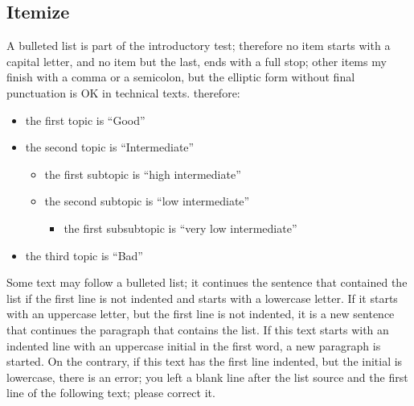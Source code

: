 \subsection{Itemize}
A bulleted list is part of the introductory test; therefore no item starts with a capital letter, and no item but the last, ends with a full stop; other items my finish with a comma or a semicolon, but the elliptic form without final punctuation is OK in technical texts. therefore:
\begin{itemize}
	\item the first topic is ``Good''
    \item the second topic is ``Intermediate''
    \begin{itemize}
	     \item the first subtopic is ``high intermediate''
	     \item the second subtopic is ``low intermediate''
	     \begin{itemize}
		      \item the first subsubtopic is ``very low intermediate''
	     \end{itemize}
\end{itemize}
\item the third topic is ``Bad''
\end{itemize}
Some text may follow a bulleted list; it continues the sentence that contained the list if the first line is not indented and starts with a lowercase letter. If it starts with an uppercase letter, but the first line is not indented, it is a new sentence that continues the paragraph that contains the list. If this text starts with an indented line with an uppercase initial in the first word, a  new paragraph is started. On the contrary, if this text has the first line indented, but the initial is lowercase, there is an error; you left a blank line after the list source  and the first line of the following text; please correct it.

